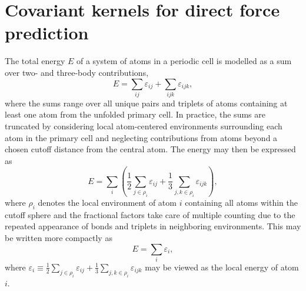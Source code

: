 \documentclass[%
superscriptaddress,
preprint,
amsmath,amssymb,
aps,
prl,
]{revtex4-1}
\begin{document}
\section{Covariant kernels for direct force prediction}
The total energy $E$ of a system of atoms in a periodic cell is modelled as a sum over two- and three-body contributions,
\begin{equation}
E = \sum_{ij} \varepsilon_{ij} + \sum_{ijk} \varepsilon_{ijk},
\end{equation}
where the sums range over all unique pairs and triplets of atoms containing at least one atom from the unfolded primary cell. In practice, the sums are truncated by considering local atom-centered environments surrounding each atom in the primary cell and neglecting contributions from atoms beyond a chosen cutoff distance from the central atom. The energy may then be expressed as
\begin{equation}
  E = \sum_{i} \left( \frac{1}{2} \sum_{j \in \rho_i} \varepsilon_{ij} + \frac{1}{3} \sum_{j, k \in \rho_i} \varepsilon_{ijk} \right),
\end{equation}
where $\rho_i$ denotes the local environment of atom $i$ containing all atoms within the cutoff sphere and the fractional factors take care of multiple counting due to the repeated appearance of bonds and triplets in neighboring environments. This may be written more compactly as
\begin{equation}
E = \sum_i \varepsilon_i,
\end{equation}
where $\varepsilon_i \equiv \frac{1}{2} \sum_{j \in \rho_i} \varepsilon_{ij} + \frac{1}{3} \sum_{j, k \in \rho_i} \varepsilon_{ijk}$ may be viewed as the local energy of atom $i$.
\end{document}
